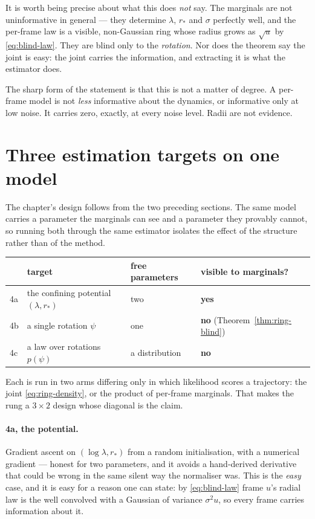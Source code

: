 \begin{intuition}
It is worth being precise about what this does \emph{not} say. The marginals are not
uninformative in general --- they determine $\lambda$, $r_*$ and $\sigma$ perfectly well, and the
per-frame law is a visible, non-Gaussian ring whose radius grows as $\sqrt{u}$ by
\eqref{eq:blind-law}. They are blind only to the \emph{rotation}. Nor does the theorem say the
joint is easy: the joint carries the information, and extracting it is what the estimator does.

The sharp form of the statement is that this is not a matter of degree. A per-frame model is not
\emph{less} informative about the dynamics, or informative only at low noise. It carries zero,
exactly, at every noise level. Radii are not evidence.
\end{intuition}

\section{Three estimation targets on one model}
\label{sec:ring-targets}

The chapter's design follows from the two preceding sections. The same model carries a parameter
the marginals can see and a parameter they provably cannot, so running both through the same
estimator isolates the effect of the structure rather than of the method.

\begin{center}\small
\begin{tabular}{@{}llll@{}}
\toprule
 & target & free parameters & visible to marginals? \\
\midrule
4a & the confining potential $(\lambda, r_*)$ & two & \textbf{yes} \\
4b & a single rotation $\psi$ & one & \textbf{no} (Theorem~\ref{thm:ring-blind}) \\
4c & a law over rotations $p(\psi)$ & a distribution & \textbf{no} \\
\bottomrule
\end{tabular}
\end{center}

\noindent
Each is run in two arms differing only in which likelihood scores a trajectory: the joint
\eqref{eq:ring-density}, or the product of per-frame marginals. That makes the rung a $3\times2$
design whose diagonal is the claim.

\paragraph{4a, the potential.} Gradient ascent on $(\log\lambda, r_*)$ from a random
initialisation, with a numerical gradient --- honest for two parameters, and it avoids a
hand-derived derivative that could be wrong in the same silent way the normaliser was. This is
the \emph{easy} case, and it is easy for a reason one can state: by \eqref{eq:blind-law} frame
$u$'s radial law is the well convolved with a Gaussian of variance $\sigma^2 u$, so every frame
carries information about it.

